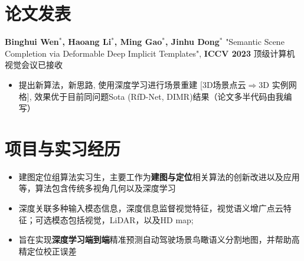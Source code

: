 \documentclass{resume}
\newlength\myheight
\begin{document}

\section{论文发表}
\textbf{Binghui Wen$^*$, Haoang Li$^*$, Ming Gao$^*$, Jinhu Dong$^*$} "Semantic Scene Completion via Deformable Deep Implicit Templates", \textbf{ICCV 2023} 顶级计算机视觉会议已接收
\begin{itemize}
	\item 提出新算法，新思路, 使用深度学习进行场景重建 [3D场景点云$\Rightarrow$3D 实例网格], 效果优于目前同问题Sota (RfD-Net, DIMR)结果（论文多半代码由我编写）
\end{itemize}
\section{项目与实习经历}
\begin{itemize}
  \item 建图定位组算法实习生，主要工作为\textcolor{tumblue}{\textbf{建图与定位}}相关算法的创新改进以及应用等，算法包含传统多视角几何以及深度学习
\end{itemize}
\begin{itemize}
  \item 深度关联多种输入模态信息，深度信息监督视觉特征，视觉语义增广点云特征；可选模态包括视觉，LiDAR，以及HD map; 
  \item 旨在实现\textcolor{tumblue}{\textbf{深度学习端到端}}精准预测自动驾驶场景鸟瞰语义分割地图，并帮助高精定位校正误差
\end{itemize}
\end{document}

